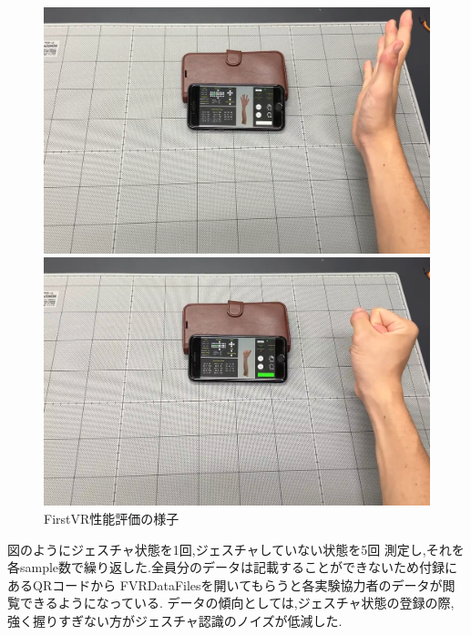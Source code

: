 \documentclass{ltjsreport}
\begin{document}
		\begin{figure}[H]
		\centering
		\begin{minipage}{0.45\columnwidth}
		\centering
		\includegraphics[width = \columnwidth]{../figs/IMG_5200.PNG}
		\end{minipage}
		\hspace{0.04\columnwidth}
		\begin{minipage}{0.45\columnwidth}
		\centering
		\includegraphics[width = \columnwidth]{../figs/IMG_5201.PNG}
		\end{minipage}
		\caption{FirstVR性能評価の様子}
		\label{fig:FirstVRevaluation}
		\end{figure}
		\vspace{-15pt}
		
		図のようにジェスチャ状態を1回,ジェスチャしていない状態を5回
		測定し,それを各sample数で繰り返した.全員分のデータは記載することができないため付録にあるQRコードから
		FVRDataFilesを開いてもらうと各実験協力者のデータが閲覧できるようになっている.
		データの傾向としては,ジェスチャ状態の登録の際,強く握りすぎない方がジェスチャ認識のノイズが低減した.
\end{document}
